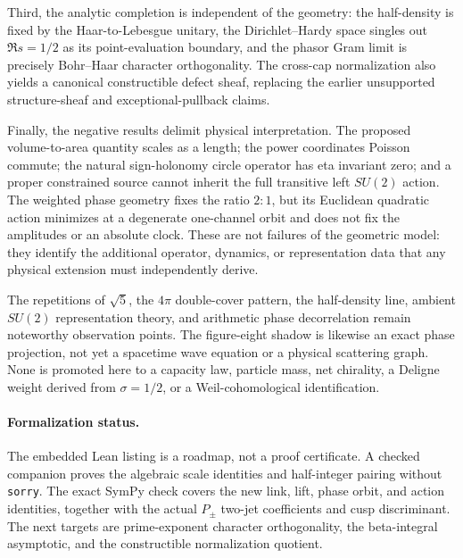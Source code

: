 \documentclass[11pt]{article}
\begin{document}
Third, the analytic completion is independent of the geometry: the
half-density is fixed by the Haar-to-Lebesgue unitary, the Dirichlet--Hardy
space singles out $\Re s=1/2$ as its point-evaluation boundary, and the phasor
Gram limit is precisely Bohr--Haar character orthogonality.  The cross-cap
normalization also yields a canonical constructible defect sheaf, replacing
the earlier unsupported structure-sheaf and exceptional-pullback claims.

Finally, the negative results delimit physical interpretation.  The proposed
volume-to-area quantity scales as a length; the power coordinates Poisson
commute; the natural sign-holonomy circle operator has eta invariant zero; and
a proper constrained source cannot inherit the full transitive left $SU(2)$
action.  The weighted phase geometry fixes the ratio $2:1$, but its Euclidean
quadratic action minimizes at a degenerate one-channel orbit and does not fix
the amplitudes or an absolute clock.  These are not failures of the geometric
model: they identify the additional operator, dynamics, or representation data
that any physical extension must independently derive.

The repetitions of $\sqrt5$, the $4\pi$ double-cover pattern, the
half-density line, ambient $SU(2)$ representation theory, and arithmetic phase
decorrelation remain noteworthy observation points.  The figure-eight shadow
is likewise an exact phase projection, not yet a spacetime wave equation or a
physical scattering graph.  None is promoted here to a capacity law, particle
mass, net chirality, a Deligne weight derived from $\sigma=1/2$, or a
Weil-cohomological identification.

\paragraph{Formalization status.}
The embedded Lean listing is a roadmap, not a proof certificate.  A checked
companion proves the algebraic scale identities and half-integer pairing
without \texttt{sorry}.  The exact SymPy check
 covers the new link, lift, phase orbit, and
action identities, together with the actual $P_\pm$ two-jet coefficients and
cusp discriminant.  The next targets are prime-exponent character
orthogonality, the beta-integral asymptotic, and the constructible
normalization quotient.
\end{document}
